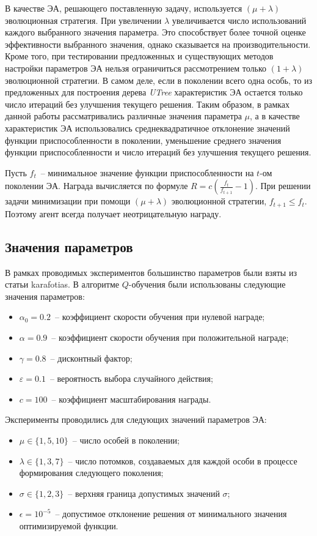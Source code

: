 В качестве ЭА, решающего поставленную задачу, используется $(\mu + \lambda)$ эволюционная стратегия. При увеличении $\lambda$ увеличивается число использований каждого выбранного значения параметра. Это способствует более точной оценке эффективности выбранного значения, однако сказывается на производительности. Кроме того, при тестировании предложенных и существующих методов настройки параметров ЭА нельзя ограничиться рассмотрением только $(1+\lambda)$ эволюционной стратегии. В самом деле, если в поколении всего одна особь, то из предложенных для построения дерева \textit{UTree} характеристик ЭА остается только число итераций без улучшения текущего решения. Таким образом, в рамках данной работы рассматривались различные значения параметра $\mu$, а в качестве характеристик ЭА использовались среднеквадратичное отклонение значений функции приспособленности в поколении, уменьшение среднего значения функции приспособленности и число итераций без улучшения текущего решения.

Пусть $f_t$~-- минимальное значение функции приспособленности на $t$-ом поколении ЭА. Награда вычисляется по формуле $R = c(\frac{f_t}{f_{t + 1}} - 1)$. При решении задачи минимизации при помощи $(\mu + \lambda)$ эволюционной стратегии, $f_{t + 1} \le f_t$. Поэтому агент всегда получает неотрицательную награду.

\subsection{Значения параметров}

В рамках проводимых экспериментов большинство параметров были взяты из статьи {karafotias}. В алгоритме $Q$-обучения были использованы следующие значения параметров:
\begin{itemize}
 \item $\alpha_0 = 0.2$~-- коэффициент скорости обучения при нулевой награде;
 \item $\alpha = 0.9$~-- коэффициент скорости обучения при положительной награде;
 \item $\gamma = 0.8$~-- дисконтный фактор;
 \item $\varepsilon = 0.1$~-- вероятность выбора случайного действия;
 \item $c = 100$~-- коэффициент масштабирования награды.
\end{itemize}

Эксперименты проводились для следующих значений параметров ЭА:
\begin{itemize}
 \item $\mu \in \{1, 5, 10\}$~-- число особей в поколении;
 \item $\lambda \in \{1, 3, 7\}$~-- число потомков, создаваемых для каждой особи в процессе формирования следующего поколения;
 \item $\sigma \in \{1, 2, 3\}$~-- верхняя граница допустимых значений $\sigma$;
 \item $\epsilon = 10^{-5}$~-- допустимое отклонение решения от минимального значения оптимизируемой функции. 
\end{itemize}

